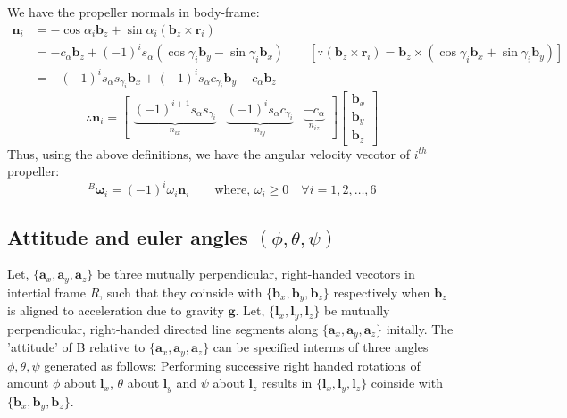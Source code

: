 We have the propeller normals in body-frame:
\begin{align*}
    \pmb{n}_i &= -\cos \alpha_i \pmb{b}_z + \sin \alpha_i ( \pmb b_z \times \pmb r_i)\\
    &= -c_{\alpha} \pmb b_z + (-1)^{i} s_{\alpha}( \cos \gamma_i \pmb b_y - \sin \gamma_i \pmb b_x) \qquad
    [\because ( \pmb b_z \times \pmb r_i) = \pmb b_z \times (\cos \gamma_i \pmb b_x + \sin \gamma_i \pmb b_y)]\\
    &= -(-1)^i s_{\alpha} s_{\gamma_i} \pmb b_x + (-1)^{i} s_{\alpha} c_{\gamma_i} \pmb b_y - c_{\alpha} \pmb b_z
\end{align*}
$$\therefore \pmb{n}_i = \begin{bmatrix}
    \underbrace{(-1)^{i+1} s_{\alpha} s_{\gamma_i}}_{n_{ix}} &
    \underbrace{(-1)^{i} s_{\alpha} c_{\gamma_i}}_{n_{iy}} &
    \underbrace{- c_{\alpha}}_{n_{iz}}
\end{bmatrix} \begin{bmatrix}
    \pmb b_x \\ \pmb b_y \\ \pmb b_z
\end{bmatrix}
$$
Thus, using the above definitions, we have the angular velocity vecotor of $i^{th}$ propeller:
$${}^B\pmb \omega_i = (-1)^{i} \omega_i \pmb n_i \qquad \text{where, }\omega_i \geq 0 \quad \forall i = 1, 2, \hdots, 6$$


\subsection{Attitude and euler angles $(\phi, \theta, \psi)$}

Let, $\{ \pmb a_x, \pmb a_y, \pmb a_z \}$ be three mutually perpendicular,
right-handed vecotors in intertial frame $R$, such that they coinside with
$\{ \pmb b_x, \pmb b_y, \pmb b_z\}$ respectively when $\pmb b_z$ is aligned to
acceleration due to gravity $\pmb g$.
Let, $\{ \pmb l_x, \pmb l_y, \pmb l_z\}$ be mutually perpendicular,
right-handed directed line segments along $\{ \pmb a_x, \pmb a_y, \pmb a_z \}$
initally.
The 'attitude' of B relative to $\{ \pmb a_x, \pmb a_y, \pmb a_z \}$ can be
specified interms of  three angles $\phi, \theta, \psi$ generated as follows:
Performing successive right handed rotations of amount $\phi$ about $\pmb l_x$,
$\theta$ about $\pmb l_y$ and $\psi$ about $\pmb l_z$ results in $\{ \pmb l_x,
\pmb l_y, \pmb l_z\}$ coinside with $\{ \pmb b_x, \pmb b_y, \pmb b_z\}$.

